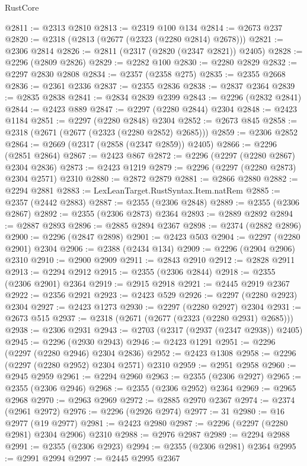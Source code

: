 \begin{lexlean}{RustCore}
\begin{coremodule}
@2811 := @2313 @2810
@2813 := @2319 @100 @134
@2814 := @2673 @237
@2820 := @2318 (@2813 (@2677 (@2323 (@2280 @2814) @2678)))
@2821 := @2306 @2814
@2826 := @2811 (@2317 (@2820 (@2347 @2821)) @2405)
@2828 := @2296 (@2809 @2826)
@2829 := @2282 @100
@2830 := @2280 @2829
@2832 := @2297 @2830 @2808
@2834 := @2357 (@2358 @275)
@2835 := @2355 @2668
@2836 := @2361 @2336
@2837 := @2355 @2836
@2838 := @2837 @2364
@2839 := @2835 @2838
@2841 := @2834 @2839 @2399
@2843 := @2296 (@2832 @2841)
@2844 := @2423 @889
@2847 := @2297 (@2280 @2844) @2304
@2848 := @2423 @1184
@2851 := @2297 (@2280 @2848) @2304
@2852 := @2673 @845
@2858 := @2318 (@2671 (@2677 (@2323 (@2280 @2852) @2685)))
@2859 := @2306 @2852
@2864 := @2669 (@2317 (@2858 (@2347 @2859)) @2405)
@2866 := @2296 (@2851 @2864)
@2867 := @2423 @867
@2872 := @2296 (@2297 (@2280 @2867) @2304 @2836)
@2873 := @2423 @1219
@2879 := @2296 (@2297 (@2280 @2873) @2304 @2571) @2310
@2880 := @2872 @2879
@2881 := @2866 @2880
@2882 := @2294 @2881
@2883 := LexLeanTarget.RustSyntax.Item.natRem
@2885 := @2357 (@2442 @2883)
@2887 := @2355 (@2306 @2848)
@2889 := @2355 (@2306 @2867)
@2892 := @2355 (@2306 @2873) @2364
@2893 := @2889 @2892
@2894 := @2887 @2893
@2896 := @2885 @2894 @2367
@2898 := @2374 (@2882 @2896)
@2900 := @2296 (@2847 @2898)
@2901 := @2423 @503
@2904 := @2297 (@2280 @2901) @2304
@2906 := @2388 (@2434 @134)
@2909 := @2296 (@2904 @2906) @2310
@2910 := @2900 @2909
@2911 := @2843 @2910
@2912 := @2828 @2911
@2913 := @2294 @2912
@2915 := @2355 (@2306 @2844)
@2918 := @2355 (@2306 @2901) @2364
@2919 := @2915 @2918
@2921 := @2445 @2919 @2367
@2922 := @2356 @2921
@2923 := @2423 @529
@2926 := @2297 (@2280 @2923) @2304
@2927 := @2423 @1273
@2930 := @2297 (@2280 @2927) @2304
@2931 := @2673 @515
@2937 := @2318 (@2671 (@2677 (@2323 (@2280 @2931) @2685)))
@2938 := @2306 @2931
@2943 := @2703 (@2317 (@2937 (@2347 @2938)) @2405)
@2945 := @2296 (@2930 @2943)
@2946 := @2423 @1291
@2951 := @2296 (@2297 (@2280 @2946) @2304 @2836)
@2952 := @2423 @1308
@2958 := @2296 (@2297 (@2280 @2952) @2304 @2571) @2310
@2959 := @2951 @2958
@2960 := @2945 @2959
@2961 := @2294 @2960
@2963 := @2355 (@2306 @2927)
@2965 := @2355 (@2306 @2946)
@2968 := @2355 (@2306 @2952) @2364
@2969 := @2965 @2968
@2970 := @2963 @2969
@2972 := @2885 @2970 @2367
@2974 := @2374 (@2961 @2972)
@2976 := @2296 (@2926 @2974)
@2977 := 31
@2980 := @16 @2977 (@19 @2977)
@2981 := @2423 @2980
@2987 := @2296 (@2297 (@2280 @2981) @2304 @2906) @2310
@2988 := @2976 @2987
@2989 := @2294 @2988
@2991 := @2355 (@2306 @2923)
@2994 := @2355 (@2306 @2981) @2364
@2995 := @2991 @2994
@2997 := @2445 @2995 @2367

\end{coremodule}
\end{lexlean}
